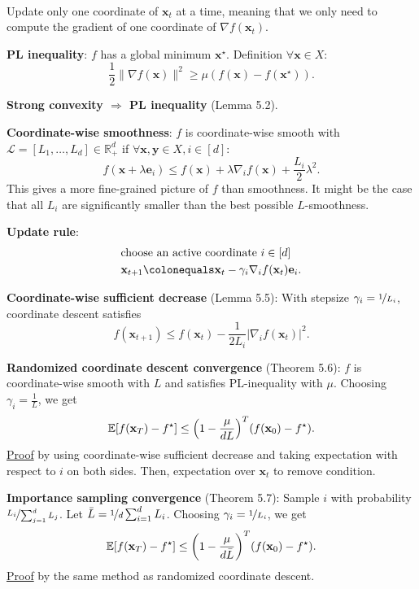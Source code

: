 \documentclass{article}
\newcommand{\lft}{\mathopen{}\mathclose\bgroup\left}
\newcommand{\rgt}{\aftergroup\egroup\right}
\newcommand{\E}{\mathbb{E}}
\newcommand{\R}{\mathbb{R}}
\renewcommand{\vec}[1]{\mathbf{#1}}
\newenvironment{topic}[1]
{\textbf{\sffamily \colorbox{black}{\rlap{\textbf{\textcolor{white}{#1}}}\hspace{\linewidth}\hspace{-2\fboxsep}}} \\ \vspace{0.2cm}}
{}
\begin{document}
\begin{multicols*}{2}
    \begin{topic}{5 Coordinate descent}
        Update only one coordinate of $\vec{x}_t$ at a time, meaning that we only need to compute the
        gradient of one coordinate of $\nabla f(\vec{x}_t)$.

        \textbf{PL inequality}: $f$ has a global minimum $\vec{x}^\star$. Definition $\forall \vec{x}
            \in X$: \[
            \frac{1}{2} \| \nabla f(\vec{x}) \|^2 \geq \mu (f(\vec{x}) - f(\vec{x}^\star)).
        \]

        \textbf{Strong convexity $\Rightarrow$ PL inequality} (Lemma 5.2).

        \textbf{Coordinate-wise smoothness}: $f$ is coordinate-wise smooth with $\mathcal{L} =
            [L_1, \ldots, L_d] \in \R_+^d$ if $\forall \vec{x}, \vec{y} \in X, i \in [d]$: \[
            f(\vec{x} + \lambda \vec{e}_i) \leq f(\vec{x}) + \lambda \nabla_i f(\vec{x}) + \frac{L_i}{2} \lambda^2.
        \]
        This gives a more fine-grained picture of $f$ than smoothness. It might be the case that all $L_i$
        are significantly smaller than the best possible $L$-smoothness.

        \textbf{Update rule}:
        \begin{align*}
             & \text{choose an active coordinate $i \in [d]$}                                   \\
             & \vec{x}_{t+1} \colonequals \vec{x}_t - \gamma_i \nabla_i f(\vec{x}_t) \vec{e}_i.
        \end{align*}

        \textbf{Coordinate-wise sufficient decrease} (Lemma 5.5): With stepsize $\gamma_i = \nicefrac{1}{L_i}$, coordinate descent satisfies \[
            f(\vec{x}_{t+1}) \leq f(\vec{x}_t) - \frac{1}{2L_i} | \nabla_i f(\vec{x}_t) |^2.
        \]

        \textbf{Randomized coordinate descent convergence} (Theorem 5.6): $f$ is coordinate-wise
        smooth with $L$ and satisfies PL-inequality with $\mu$. Choosing $\gamma_i = \frac{1}{L}$, we
        get \[
            \E[f(\vec{x}_T) - f^\star] \leq \lft( 1 - \frac{\mu}{dL} \rgt)^T (f(\vec{x}_0) - f^\star).
        \]
        \underline{Proof} by using coordinate-wise sufficient decrease and taking expectation with
        respect to $i$ on both sides. Then, expectation over $\vec{x}_t$ to remove condition.

        \textbf{Importance sampling convergence} (Theorem 5.7): Sample $i$ with probability $\nicefrac{L_i}{\sum_{j=1}^{d} L_j}$. Let $\bar{L} = \nicefrac{1}{d} \sum_{i=1}^{d} L_i$. Choosing $\gamma_i = \nicefrac{1}{L_i}$, we get \[
            \E[f(\vec{x}_T) - f^\star] \leq \lft( 1 - \frac{\mu}{d \bar{L}} \rgt)^T (f(\vec{x}_0) - f^\star).
        \]
        \underline{Proof} by the same method as randomized coordinate descent.


\end{topic}
\end{multicols*}
\end{document}
